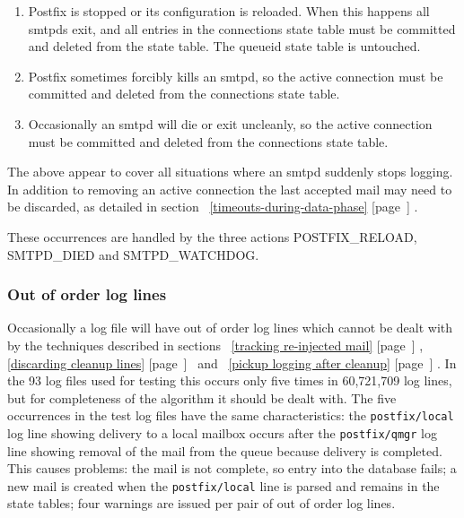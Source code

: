 \documentclass[a4paper,12pt,draft]{article}
\newcommand{\refwithpage}[1]{%
    \empty{}\ref{#1} [page~\pageref{#1}]%
}
\begin{document}
\begin{enumerate}

    \item Postfix is stopped or its configuration is reloaded.  When this
        happens all smtpds exit, and all entries in the connections state
        table must be committed and deleted from the state table.  The
        queueid state table is untouched.

    \item Postfix sometimes forcibly kills an smtpd, so the active
        connection must be committed and deleted from the connections state
        table.

    \item Occasionally an smtpd will die or exit uncleanly, so the active
        connection must be committed and deleted from the connections state
        table.

\end{enumerate}

The above appear to cover all situations where an smtpd suddenly stops
logging.  In addition to removing an active connection the last accepted
mail may need to be discarded, as detailed in
section~\refwithpage{timeouts-during-data-phase}.

These occurrences are handled by the three actions POSTFIX\_RELOAD,
SMTPD\_DIED and SMTPD\_WATCHDOG\@.

\subsubsection{Out of order log lines}

\label{out of order log lines}

Occasionally a log file will have out of order log lines which cannot be
dealt with by the techniques described in sections~\refwithpage{tracking
re-injected mail},~\refwithpage{discarding cleanup
lines}~and~\refwithpage{pickup logging after cleanup}.  In the 93 log files
used for testing this occurs only five times in 60,721,709 log lines, but
for completeness of the algorithm it should be dealt with.  The five
occurrences in the test log files have the same characteristics: the
\texttt{postfix/local} log line showing delivery to a local mailbox occurs
after the \texttt{postfix/qmgr} log line showing removal of the mail from
the queue because delivery is completed.  This causes problems: the mail is
not complete, so entry into the database fails; a new mail is created when
the \texttt{postfix/local} line is parsed and remains in the state tables;
four warnings are issued per pair of out of order log lines.
\end{document}
